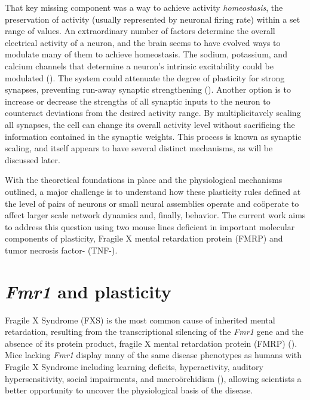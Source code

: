 That key missing component was a way to achieve activity \textit{homeostasis}, the preservation of activity (usually represented by neuronal firing rate) within a set range of values. An extraordinary number of factors determine the overall electrical activity of a neuron, and the brain seems to have evolved ways to modulate many of them to achieve homeostasis. The sodium, potassium, and calcium channels that determine a neuron's intrinsic excitability could be modulated (\cite{Franklin1992}). The system could attenuate the degree of plasticity for strong synapses, preventing run-away synaptic strengthening (\cite{VanRossum2000}). Another option is to increase or decrease the strengths of all synaptic inputs to the neuron to counteract deviations from the desired activity range. By multiplicitavely scaling all synapses, the cell can change its overall activity level without sacrificing the information contained in the synaptic weights. This process is known as synaptic scaling, and itself appears to have several distinct mechanisms, as will be discussed later.

With the theoretical foundations in place and the physiological mechanisms outlined, a major challenge is to understand how these plasticity rules defined at the level of pairs of neurons or small neural assemblies operate and co\"operate to affect larger scale network dynamics and, finally, behavior. The current work aims to address this question using two mouse lines deficient in important molecular components of plasticity, Fragile X mental retardation protein (FMRP) and tumor necrosis factor-\textalpha{} (TNF-\textalpha{}).

\section{\textit{Fmr1} and plasticity}

Fragile X Syndrome (FXS) is the most common cause of inherited mental retardation, resulting from the transcriptional silencing of the \textit{Fmr1} gene and the absence of its protein product, fragile X mental retardation protein (FMRP) (\cite{Bailey1998, Jin2003}). Mice lacking \textit{Fmr1} display many of the same disease phenotypes as humans with Fragile X Syndrome including learning deficits, hyperactivity, auditory hypersensitivity, social impairments, and macro\"orchidism (\cite{DutchBelgianFragileXConsortium1994, Bernardet2006, Moy2008}), allowing scientists a better opportunity to uncover the physiological basis of the disease.

